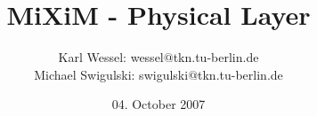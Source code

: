 \documentclass[10pt, a4paper]{article}
\begin{document}
\title{MiXiM - Physical Layer}
\author{Karl Wessel: wessel$@$tkn.tu-berlin.de\\
Michael Swigulski: swigulski$@$tkn.tu-berlin.de}
\date{04. October 2007}
\maketitle




\end{document}
